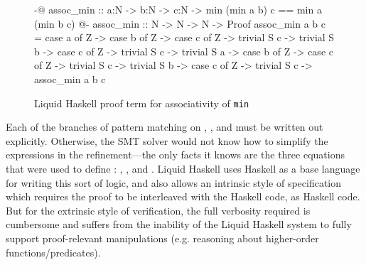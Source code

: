 \begin{figure}
\begin{code}
  {-@ assoc_min :: a:N -> b:N -> c:N ->
        {min (min a b) c == min a (min b c)} @-}
  assoc_min :: N -> N -> N -> Proof
  assoc_min a b c =
    case a of 
      Z ->
        case b of 
          Z ->
            case c of
              Z -> trivial
              S c -> trivial
          S b ->
            case c of
              Z -> trivial
              S c -> trivial
    S a ->
      case b of 
        Z ->
          case c of
            Z -> trivial
            S c -> trivial
        S b ->
          case c of
            Z -> trivial
            S c -> assoc_min a b c
\end{code}
\caption{Liquid Haskell proof term for associativity of \texttt{min}}
\label{fig:assoc-min-proof}
\end{figure}

Each of the branches of pattern matching on , , and 
must be written out explicitly. Otherwise, the SMT solver would not
know how to simplify the  expressions in the refinement---the
only facts it knows are the three equations that were used to define
: , , and
%
.
%
Liquid Haskell uses Haskell as a base language for
writing this sort of logic, and also allows an intrinsic style of
specification which requires the proof to be interleaved with the
Haskell code, as Haskell code.  But for the extrinsic style of
verification, the full verbosity required is cumbersome and suffers
from the inability of the Liquid Haskell system to fully support
proof-relevant manipulations (e.g. reasoning about higher-order
functions/predicates).


